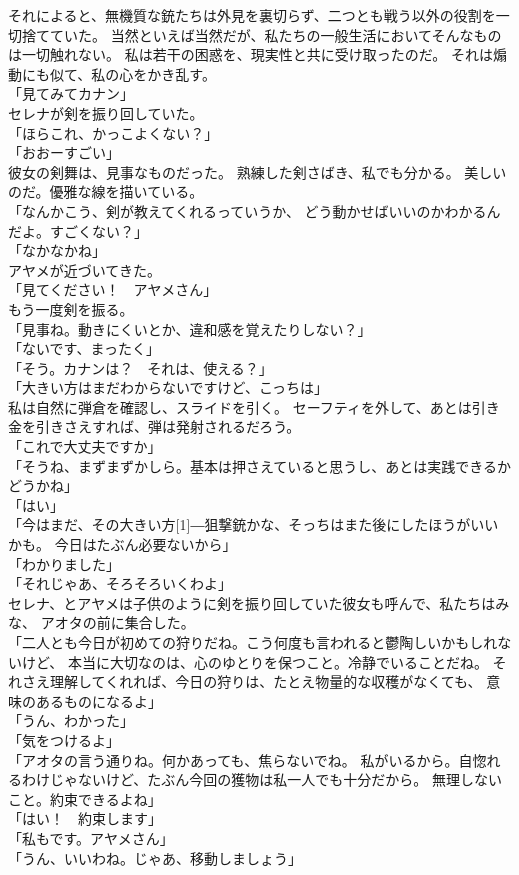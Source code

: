 \documentclass[../IHMain]{subfiles}
\begin{document}
それによると、無機質な銃たちは外見を裏切らず、二つとも戦う以外の役割を一切捨てていた。
当然といえば当然だが、私たちの一般生活においてそんなものは一切触れない。
私は若干の困惑を、現実性と共に受け取ったのだ。
それは煽動にも似て、私の心をかき乱す。\\
「見てみてカナン」\\
セレナが剣を振り回していた。\\
「ほらこれ、かっこよくない？」\\
「おおーすごい」\\
彼女の剣舞は、見事なものだった。
熟練した剣さばき、私でも分かる。
美しいのだ。優雅な線を描いている。\\
「なんかこう、剣が教えてくれるっていうか、
どう動かせばいいのかわかるんだよ。すごくない？」\\
「なかなかね」\\
アヤメが近づいてきた。\\
「見てください！　アヤメさん」\\
もう一度剣を振る。\\
「見事ね。動きにくいとか、違和感を覚えたりしない？」\\
「ないです、まったく」\\
「そう。カナンは？　それは、使える？」\\
「大きい方はまだわからないですけど、こっちは」\\
私は自然に弾倉を確認し、スライドを引く。
セーフティを外して、あとは引き金を引きさえすれば、弾は発射されるだろう。\\
「これで大丈夫ですか」\\
「そうね、まずまずかしら。基本は押さえていると思うし、あとは実践できるかどうかね」\\
「はい」\\
「今はまだ、その大きい方\scalebox{3}[1]{―}狙撃銃かな、そっちはまた後にしたほうがいいかも。
今日はたぶん必要ないから」\\
「わかりました」\\
「それじゃあ、そろそろいくわよ」\\
セレナ、とアヤメは子供のように剣を振り回していた彼女も呼んで、私たちはみな、
アオタの前に集合した。\\
「二人とも今日が初めての狩りだね。こう何度も言われると鬱陶しいかもしれないけど、
本当に大切なのは、心のゆとりを保つこと。冷静でいることだね。
それさえ理解してくれれば、今日の狩りは、たとえ物量的な収穫がなくても、
意味のあるものになるよ」\\
「うん、わかった」\\
「気をつけるよ」\\
「アオタの言う通りね。何かあっても、焦らないでね。
私がいるから。自惚れるわけじゃないけど、たぶん今回の獲物は私一人でも十分だから。
無理しないこと。約束できるよね」\\
「はい！　約束します」\\
「私もです。アヤメさん」\\
「うん、いいわね。じゃあ、移動しましょう」
\end{document}
